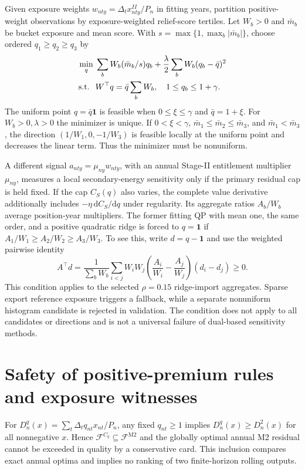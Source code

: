 \documentclass[11pt]{article}
\newcommand{\one}{\mathbf1}
\newcommand{\F}{\mathcal F}
\begin{document}
Given exposure weights $w_{nty}=\Delta_t x_{nty}^{II}/P_n$ in fitting years, partition positive-weight observations by exposure-weighted relief-score tertiles. Let $W_b>0$ and $\bar m_b$ be bucket exposure and mean score. With $s=\max\{1,\max_b|\bar m_b|\}$, choose ordered $q_1\geq q_2\geq q_3$ by
\begin{align}
 \min_q\;&\sum_b W_b(\bar m_b/s)q_b+\frac\lambda2\sum_b W_b(q_b-\bar q)^2\notag\\
 \text{s.t. }\;&W^\top q=\bar q\sum_bW_b,\quad1\leq q_b\leq1+\gamma.\label{eq:card}
\end{align}
The uniform point $q=\bar q\one$ is feasible when $0\leq\xi\leq\gamma$ and $\bar q=1+\xi$. For $W_b>0,\lambda>0$ the minimizer is unique. If $0<\xi<\gamma$, $\bar m_1\leq\bar m_2\leq\bar m_3$, and $\bar m_1<\bar m_3$, the direction $(1/W_1,0,-1/W_3)$ is feasible locally at the uniform point and decreases the linear term. Thus the minimizer must be nonuniform.

A different signal $a_{nty}=\mu_{ny}w_{nty}$, with an annual Stage-II entitlement multiplier $\mu_{ny}$, measures a local secondary-energy sensitivity only if the primary residual cap is held fixed. If the cap $C_S(q)$ also varies, the complete value derivative additionally includes $-\eta\,\mathrm d C_S/\mathrm dq$ under regularity. Its aggregate ratios $A_b/W_b$ average position-year multipliers. The former fitting QP with mean one, the same order, and a positive quadratic ridge is forced to $q=\one$ if $A_1/W_1\geq A_2/W_2\geq A_3/W_3$. To see this, write $d=q-\one$ and use the weighted pairwise identity
\begin{equation}
 A^\top d=\frac{1}{\sum_bW_b}\sum_{i<j}W_iW_j\left(\frac{A_i}{W_i}-\frac{A_j}{W_j}\right)(d_i-d_j)\geq0.
\end{equation}
This condition applies to the selected $\rho=0.15$ ridge-import aggregates. Sparse export reference exposure triggers a fallback, while a separate nonuniform histogram candidate is rejected in validation. The condition does not apply to all candidates or directions and is not a universal failure of dual-based sensitivity methods.

\section{Safety of positive-premium rules and exposure witnesses}
For $D_n^q(x)=\sum_t\Delta_t q_{nt}x_{nt}/P_n$, any fixed $q_{nt}\geq1$ implies $D_n^q(x)\geq D_n^2(x)$ for all nonnegative $x$. Hence $\F^{C_q}\subseteq\F^{\mathrm{M2}}$ and the globally optimal annual M2 residual cannot be exceeded in quality by a conservative card. This inclusion compares exact annual optima and implies no ranking of two finite-horizon rolling outputs.
\end{document}
